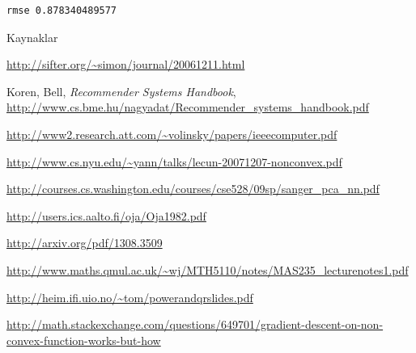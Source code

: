 \documentclass[12pt,fleqn]{article}\usepackage{../common}
\begin{document}
\begin{verbatim}
rmse 0.878340489577
\end{verbatim}










Kaynaklar

\url{http://sifter.org/~simon/journal/20061211.html}

Koren, Bell, {\em Recommender Systems Handbook},
\url{http://www.cs.bme.hu/nagyadat/Recommender_systems_handbook.pdf}

\url{http://www2.research.att.com/~volinsky/papers/ieeecomputer.pdf}

\url{http://www.cs.nyu.edu/~yann/talks/lecun-20071207-nonconvex.pdf}

\url{http://courses.cs.washington.edu/courses/cse528/09sp/sanger_pca_nn.pdf}

\url{http://users.ics.aalto.fi/oja/Oja1982.pdf}

\url{http://arxiv.org/pdf/1308.3509}

\url{http://www.maths.qmul.ac.uk/~wj/MTH5110/notes/MAS235_lecturenotes1.pdf}

\url{http://heim.ifi.uio.no/~tom/powerandqrslides.pdf}

\url{http://math.stackexchange.com/questions/649701/gradient-descent-on-non-convex-function-works-but-how}
\end{document}
